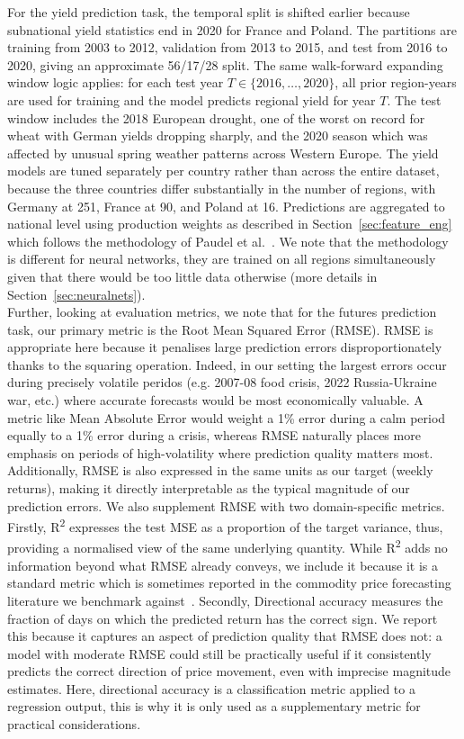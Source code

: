 \documentclass[pdflatex,sn-mathphys-num, oneside, 11pt]{sn-jnl}%
\theoremstyle{thmstyleone}%
\theoremstyle{thmstyletwo}%
\theoremstyle{thmstylethree}%
\begin{document}
For the yield prediction task, the temporal split is shifted earlier 
because subnational yield statistics end in 2020 for France and Poland. 
The partitions are training from 2003 to 2012, validation from 2013 to 
2015, and test from 2016 to 2020, giving an approximate 56/17/28 split. 
The same walk-forward expanding window logic applies: for each test year 
$T \in \{2016, \ldots, 2020\}$, all prior region-years are used for 
training and the model predicts regional yield for year $T$. The test 
window includes the 2018 European drought, one of the worst on record for 
wheat with German yields dropping sharply, and the 2020 season which was 
affected by unusual spring weather patterns across Western Europe. The 
yield models are tuned separately per country rather than across the 
entire dataset, because the three countries differ substantially in the 
number of regions, with Germany at 251, France at 90, and Poland at 16. 
Predictions are aggregated to national level using production weights as
described in Section~\ref{sec:feature_eng} which follows the methodology 
of Paudel et al.~\cite{bib16}. We note that the methodology is different
for neural networks, they are trained on all regions simultaneously given
that there would be too little data otherwise (more details in 
Section~\ref{sec:neuralnets}).\\

Further, looking at evaluation metrics, we note that for the futures prediction 
task, our primary metric is the Root Mean Squared Error (RMSE). 
RMSE is appropriate here because it 
penalises large prediction errors disproportionately thanks to the 
squaring operation. Indeed, in our setting the largest errors occur during 
precisely volatile peridos (e.g. 2007-08 food crisis, 2022 Russia-Ukraine war, etc.) where accurate forecasts would be most economically valuable.
A metric like Mean Absolute Error would weight a 
1\% error during a calm period equally to a 1\% error during a crisis, 
whereas RMSE naturally places more emphasis on periods of high-volatility 
where prediction quality matters most. Additionally, RMSE is also expressed in 
the same units as our target (weekly returns), making it directly 
interpretable as the typical magnitude of our prediction errors. We also 
supplement RMSE with two domain-specific metrics. 
Firstly, R\textsuperscript{2} expresses the test MSE as a proportion of the 
target variance, thus, providing a normalised view of the same underlying 
quantity. While R\textsuperscript{2} adds no information beyond what RMSE already conveys, we include it because it is a standard metric which is 
sometimes reported in the commodity price forecasting literature we benchmark 
against~\cite{bib21}. Secondly, Directional accuracy measures the fraction of days on which the predicted return has the correct sign. We report this 
because it captures an aspect of prediction quality that RMSE does not: 
a model with moderate RMSE could still be practically useful if it 
consistently predicts the correct direction of price movement, even 
with imprecise magnitude estimates. Here, directional accuracy is a
classification metric applied to a regression output, this is why it is only used as a supplementary metric for practical considerations.\\
\end{document}
